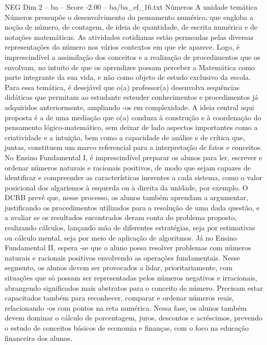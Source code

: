 \begin{textsample}{NEG Dim 2 – ba – Score -2.00 – ba/ba\_ef\_16.txt}  \label{ex:f2_neg_251}
Números A unidade temática Números pressupõe o desenvolvimento do pensamento numérico, que engloba a noção de número, de contagem, de ideia de quantidade, de escrita numérica e de notações matemáticas.
As atividades cotidianas estão permeadas pelas diversas representações do número nos vários contextos em que ele aparece.
Logo, é imprescindível a assimilação dos conceitos e a realização de procedimentos que os envolvam, no intuito de que os aprendizes possam perceber a Matemática como parte integrante da sua vida, e não como objeto de estudo exclusivo da escola.
Para essa temática, é desejável que o(a) professor(a) desenvolva sequências didáticas que permitam ao estudante estender conhecimentos e procedimentos já adquiridos anteriormente, ampliando -os em complexidade.
A ideia central aqui proposta é a de uma mediação que o(a) conduza à construção e à coordenação do pensamento lógico-matemático, sem deixar de lado aspectos importantes como a criatividade e a intuição, bem como a capacidade de análise e de crítica que, juntas, constituem um marco referencial para a interpretação de fatos e conceitos.
No Ensino Fundamental I, é imprescindível preparar os alunos para ler, escrever e ordenar números naturais e racionais positivos, de modo que sejam capazes de identificar e compreender as características inerentes a cada sistema, como o valor posicional dos algarismos à esquerda ou à direita da unidade, por exemplo.
O DCRB prevê que, nesse processo, os alunos também aprendam a argumentar, justificando os procedimentos utilizados para a resolução de uma dada questão, e a avaliar se os resultados encontrados deram conta do problema proposto, realizando cálculos, lançando mão de diferentes estratégias, seja por estimativas ou cálculo mental, seja por meio de aplicação de algoritmos.
Já no Ensino Fundamental II, espera -se que o aluno possa resolver problemas com números naturais e racionais positivos envolvendo as operações fundamentais.
Nesse segmento, os alunos devem ser provocados a lidar, prioritariamente, com situações que só possam ser representadas pelos números negativos e irracionais, abrangendo significados mais abstratos para o conceito de número.
Precisam estar capacitados também para reconhecer, comparar e ordenar números reais, relacionando -os com pontos na reta numérica.
Nessa fase, os alunos também devem dominar o cálculo de porcentagem, juros, descontos e acréscimos, prevendo o estudo de conceitos básicos de economia e finanças, com o foco na educação financeira dos alunos.

\end{textsample}
